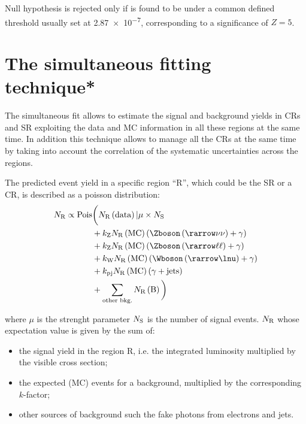 Null hypothesis is rejected only if \p is found to be under a common defined threshold usually set at \num{2.87e-7}, corresponding to a significance of $Z=5$.

\section{The simultaneous fitting technique*}
\label{sec:simfit}
The simultaneous fit allows to estimate the signal and background yields in CRs and SR exploiting the data and MC information in all these regions at the same time. In addition this technique allows to manage all the CRs at the same time by taking into account the correlation of the systematic uncertainties across the regions.

The predicted event yield in a specific region ``R'', which could be the SR or a CR, is described as a poisson distribution:
\begin{equation}
\begin{split}
		N_\textup{R} \propto \text{Pois} &\bigg( N_\textup{R}\left(\text{data}\right)\vert \mu\times N_\textup{S} \\
						&+ k_{\textup{Z}} N_{\textup{R}}\left(\text{MC}\right) \left(\Zboson \left(\rarrow \nu\nu \right) +  \gamma\right) \\
						&+ k_{\textup{Z}}N_\textup{R}\left(\text{MC}\right) \left(\Zboson \left(\rarrow \ell\ell\right) + \gamma \right) \\
						&+ k_{\textup{W}}N_\textup{R}\left(\text{MC}\right) \left(\Wboson \left(\rarrow \lnu\right)+ \gamma \right) \\
					 	&+ k_{\textup{pj}}N_{\textup{R}}\left(\text{MC}\right) \left(\gamma + \text{jets} \right)\\  
					 	&+ \sum_{\textup{other bkg.}} N_{\textup{R}}\left(\text{B}\right) \bigg)
\end{split}
\label{eqn:nr}
\end{equation}

where $\mu$ is the strenght parameter $N_\textup{S}$ is the number of signal events. $N_\textup{R}$  whose expectation value is given by the sum of:
\begin{itemize}
\item the signal yield in the region R, i.e. the integrated luminosity multiplied by the visible cross section;
\item the expected (MC) events for a background, multiplied by the corresponding $k$-factor;
\item other sources of background such the fake photons from electrons and jets.
\end{itemize}

